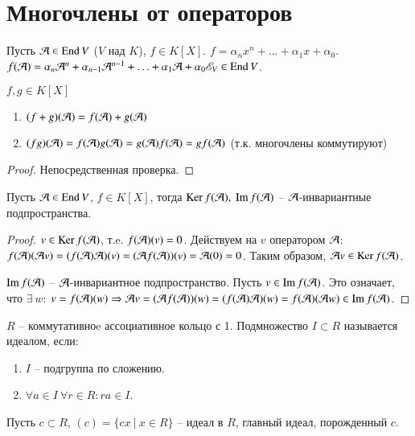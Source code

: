 \documentclass[main]{subfiles}
\begin{document}
\chapter{Многочлены от операторов}

Пусть $\mathcal{A} \in \operatorname{End} V$ ($V$ над $K$), $f \in K[X]$. $f = \alpha_n x^n + \ldots + \alpha_1 x + \alpha_0$.
$f(\mathcal{A}) = \alpha_n  {\mathcal{A}}^n + \alpha_{n-1} {\mathcal{A}}^{n-1} + \ldots + \alpha_1 \mathcal{A} + \alpha_0 \mathscr{E}_V \in \operatorname{End} V$.

\begin{proposition}
    $f, g \in K[X]$
    \begin{enumerate}
        \item $(f+g)(\mathcal{A}) = f(\mathcal{A}) + g(\mathcal{A})$
        \item $(fg)(\mathcal{A}) = f(\mathcal{A})g(\mathcal{A}) =g(\mathcal{A})f(\mathcal{A})=gf(\mathcal{A})$ (т.к. многочлены коммутируют)
    \end{enumerate}
\end{proposition}

\begin{proof}
    Непосредственная проверка.
\end{proof}

\begin{corollary}
    Пусть $\mathcal{A} \in \operatorname{End} V$, $f \in K[X]$, тогда $\operatorname{Ker} f(\mathcal{A}), \ \operatorname{Im} f(\mathcal{A})$ -- $\mathcal{A}$-инвариантные подпространства.
\end{corollary}

\begin{proof}
    $v \in \operatorname{Ker} f(\mathcal{A})$, т.e. $f(\mathcal{A}) (v) = 0$. Действуем на $v$ оператором $\mathcal{A}$: $f(\mathcal{A})(\mathcal{A} v) =
        (f(\mathcal{A})\mathcal{A})(v) = (\mathcal{A} f(\mathcal{A}))(v) = \mathcal{A}(0) = 0$.
    Таким образом, $\mathcal{A} v \in \operatorname{Ker} f(\mathcal{A})$.

    $\operatorname{Im} f(\mathcal{A})$ -- $\mathcal{A}$-инвариантное подпространство.
    Пусть $v \in \operatorname{Im} f(\mathcal{A})$. Это означает, что $\exists \ w$: $v = f(\mathcal{A})(w) \Rightarrow
        \mathcal{A} v = (\mathcal{A} f(\mathcal{A}))(w) = (f(\mathcal{A})\mathcal{A})(w) = f(\mathcal{A})(\mathcal{A} w) \in \operatorname{Im} f(\mathcal{A})$.
\end{proof}

$R$ -- коммутативноe ассоциативное кольцо с 1. Подмножество $I\subset R$ называется идеалом, если:
\begin{enumerate}
    \item $I$ -- подгруппа по сложению.
    \item $\forall a \in I \ \forall r \in R : ra \in I$.
\end{enumerate}

Пусть $c \subset R$, $(c) = \{cx  \ | \ x \in R\}$ -- идеал в $R$, главный идеал, порожденный $c$.
\end{document}

